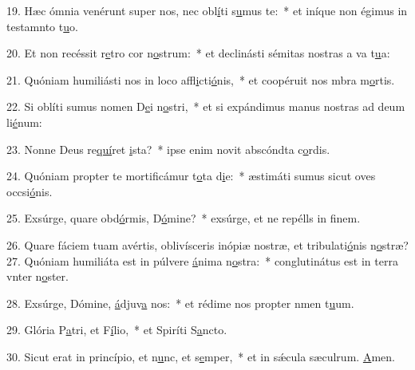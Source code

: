 19. Hæc ómnia venérunt super nos, nec obl\uline{í}ti s\uline{u}mus te:~* et iníque non égimus in testamnto t\uline{u}o.\par 
20. Et non recéssit r\uline{e}tro cor n\uline{o}strum:~* et declinásti sémitas nostras a va t\uline{u}a:\par 
21. Quóniam humiliásti nos in loco affl\uline{i}cti\uline{ó}nis,~* et coopéruit nos mbra m\uline{o}rtis.\par 
22. Si oblíti sumus nomen D\uline{e}i n\uline{o}stri,~* et si expándimus manus nostras ad deum li\uline{é}num:\par 
23. Nonne Deus re\uline{quí}ret \uline{i}sta?~* ipse enim novit abscóndta c\uline{o}rdis.\par 
24. Quóniam propter te mortificámur t\uline{o}ta d\uline{i}e:~* æstimáti sumus sicut oves occsi\uline{ó}nis.\par 
25. Exsúrge, quare obd\uline{ó}rmis, D\uline{ó}mine?~* exsúrge, et ne repélls in f\uline{i}nem.\par 
26. Quare fáciem tuam avértis, oblivísceris inópiæ nostræ, et tribulati\uline{ó}nis n\uline{o}stræ?
27. Quóniam humiliáta est in púlvere \uline{á}nima n\uline{o}stra:~* conglutinátus est in terra vnter n\uline{o}ster.\par 
28. Exsúrge, Dómine, \uline{á}djuv\uline{a} nos:~* et rédime nos propter nmen t\uline{u}um.\par 
29. Glória P\uline{a}tri, et F\uline{í}lio,~* et Spiríti S\uline{a}ncto.\par 
30. Sicut erat in princípio, et n\uline{u}nc, et s\uline{e}mper,~* et in sǽcula sæculrum. \uline{A}men.\par 

